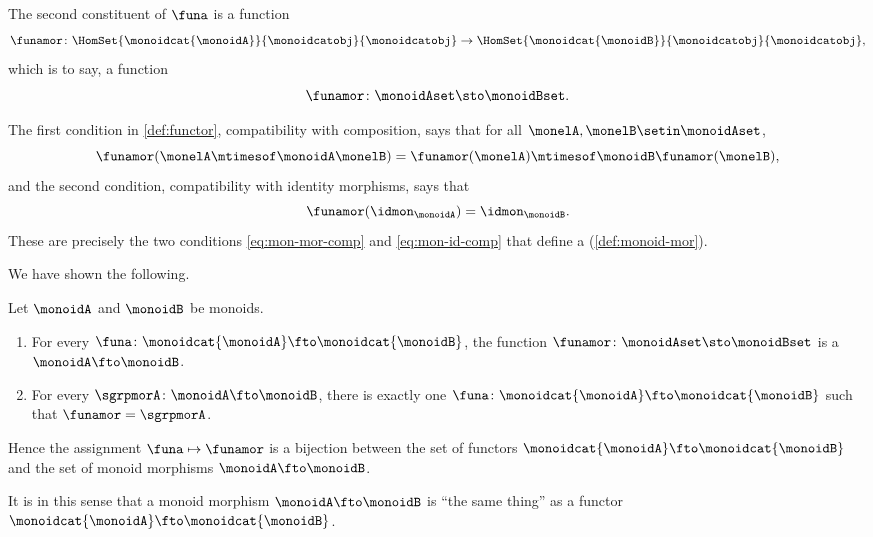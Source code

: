 The second constituent of $\funa$ is a function
\begin{equation}
    \funamor \colon \HomSet{\monoidcat{\monoidA}}{\monoidcatobj}{\monoidcatobj} \to \HomSet{\monoidcat{\monoidB}}{\monoidcatobj}{\monoidcatobj},
\end{equation}
which is to say, a function
\begin{equation}
    \funamor \colon \monoidAset \sto \monoidBset.
\end{equation}

The first condition in \cref{def:functor}, compatibility with composition, says that for all $\monelA, \monelB \setin \monoidAset$,
\begin{equation}
    \label{eq:monoidcat-functor-composition}
    \funamor(\monelA \mtimesof\monoidA \monelB) = \funamor(\monelA) \mtimesof\monoidB \funamor(\monelB),
\end{equation}
and the second condition, compatibility with identity morphisms, says that
\begin{equation}
    \label{eq:monoidcat-functor-identity}
    \funamor(\idmon_\monoidA) = \idmon_\monoidB.
\end{equation}
These are precisely the two conditions \cref{eq:mon-mor-comp} and \cref{eq:mon-id-comp} that define a  (\cref{def:monoid-mor}).

We have shown the following.

\begin{lemma}
    \label{lem:monoid-hom-as-functor}
    Let $\monoidA$ and $\monoidB$ be monoids.
    \begin{enumerate}
        \item For every  $\funa \colon \monoidcat{\monoidA} \fto \monoidcat{\monoidB}$, the function $\funamor \colon \monoidAset \sto \monoidBset$ is a  $\monoidA \fto \monoidB$.
        \item For every  $\sgrpmorA \colon \monoidA \fto \monoidB$, there is exactly one  $\funa \colon \monoidcat{\monoidA} \fto \monoidcat{\monoidB}$ such that $\funamor = \sgrpmorA$.
    \end{enumerate}
    Hence the assignment $\funa \mapsto \funamor$ is a bijection between the set of functors $\monoidcat{\monoidA} \fto \monoidcat{\monoidB}$ and the set of monoid morphisms $\monoidA \fto \monoidB$.
\end{lemma}

It is in this sense that a monoid morphism $\monoidA \fto \monoidB$ is ``the same thing'' as a functor $\monoidcat{\monoidA} \fto \monoidcat{\monoidB}$.

